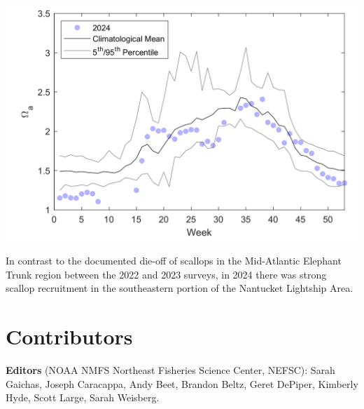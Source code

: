 \documentclass[
  10pt,
]{article}
\let\origfigure\figure
\let\endorigfigure\endfigure
\renewenvironment{figure}[1][2] {
    \expandafter\origfigure\expandafter[H]
} {
    \endorigfigure
}
\begin{document}
\begin{figure}

{\centering \includegraphics[width=0.6\linewidth]{midatlantic_files/figure-latex/GOMoa-1} 

}

\caption{Weekly average surface aragonite saturation state measured at the long-term buoy location in the Gulf of Maine at 43.02 N and 70.54 W}\label{fig:GOMoa}
\end{figure}

In contrast to the documented die-off of scallops in the Mid-Atlantic Elephant Trunk region between the 2022 and 2023 surveys, in 2024 there was strong scallop recruitment in the southeastern portion of the Nantucket Lightship Area.

\section{Contributors}\label{contributors}

\textbf{Editors} (NOAA NMFS Northeast Fisheries Science Center, NEFSC): Sarah Gaichas, Joseph Caracappa, Andy Beet, Brandon Beltz, Geret DePiper, Kimberly Hyde, Scott Large, Sarah Weisberg.
\end{document}
